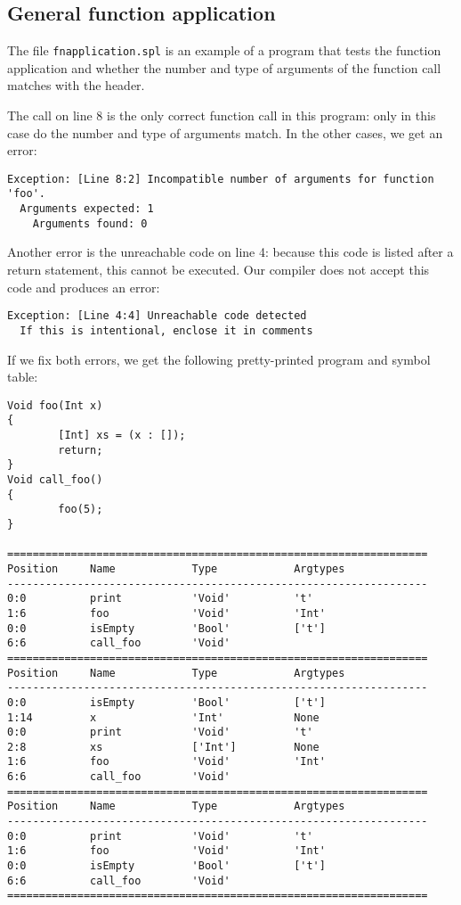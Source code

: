 \documentclass[a4paper]{article}
\begin{document}
\subsection{General function application}
The file {\tt fnapplication.spl} is an example of a program that tests the function application and whether the number and type of arguments of the function call matches with the header.

The call on line 8 is the only correct function call in this program: only in this case do the number and type of arguments match. In the other cases, we get an error: 
\begin{verbatim}
Exception: [Line 8:2] Incompatible number of arguments for function 'foo'.
  Arguments expected: 1
    Arguments found: 0
\end{verbatim}
Another error is the unreachable code on line 4: because this code is listed after a return statement, this cannot be executed. Our compiler does not accept this code and produces an error: 
\begin{verbatim}
Exception: [Line 4:4] Unreachable code detected
  If this is intentional, enclose it in comments
\end{verbatim}
If we fix both errors, we get the following pretty-printed program and symbol table: 
\begin{verbatim}
Void foo(Int x)
{
        [Int] xs = (x : []);
        return;
}
Void call_foo()
{
        foo(5);
}

==================================================================
Position     Name            Type            Argtypes            
------------------------------------------------------------------
0:0          print           'Void'          't'                 
1:6          foo             'Void'          'Int'               
0:0          isEmpty         'Bool'          ['t']               
6:6          call_foo        'Void'                              
==================================================================
Position     Name            Type            Argtypes            
------------------------------------------------------------------
0:0          isEmpty         'Bool'          ['t']               
1:14         x               'Int'           None                
0:0          print           'Void'          't'                 
2:8          xs              ['Int']         None                
1:6          foo             'Void'          'Int'               
6:6          call_foo        'Void'                              
==================================================================
Position     Name            Type            Argtypes            
------------------------------------------------------------------
0:0          print           'Void'          't'                 
1:6          foo             'Void'          'Int'               
0:0          isEmpty         'Bool'          ['t']               
6:6          call_foo        'Void'                              
==================================================================
\end{verbatim}
\end{document}
